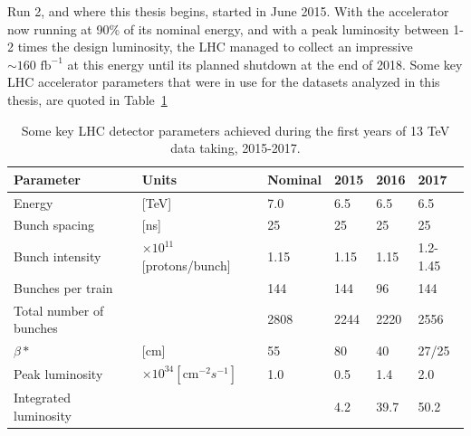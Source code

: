 Run 2, and where this thesis begins, started in June 2015. With the accelerator now running at 90\% of its nominal energy, and with a peak luminosity between 1-2 times the design luminosity, the LHC managed to collect an impressive $\sim 160 \textrm{ fb}^{-1}$ at this energy until its planned shutdown at the end of 2018. Some key LHC accelerator parameters that were in use for the datasets analyzed in this thesis, are quoted in Table~\ref{tab:LHCparameters}

\begin{table}[]
\begin{tabular}{| l | lllll |}
\hline
Parameter               & Units                                   & Nominal & 2015 & 2016 & 2017     \\
\hline
Energy                  & {[}TeV{]}                               & 7.0     & 6.5  & 6.5  & 6.5      \\
Bunch spacing           & {[}ns{]}                                & 25      & 25   & 25   & 25       \\
Bunch intensity         & $\times10^{11}${[}protons/bunch{]}              & 1.15    & 1.15 & 1.15 & 1.2-1.45 \\
Bunches per train       &                                         & 144     & 144  & 96   & 144      \\
Total number of bunches &                                         & 2808    & 2244 & 2220 & 2556     \\
$\beta*$                & {[}cm{]}                                       & 55      & 80   & 40   & 27/25    \\
Peak luminosity         & $\times 10^{34} [\textrm{cm}^{-2} s^{-1}]$ & 1.0     & 0.5  & 1.4  & 2.0      \\
Integrated luminosity   &                                         &         & 4.2  & 39.7 & 50.2    \\
\hline
\end{tabular}
\caption{Some key LHC detector parameters achieved during the first years of 13 TeV data taking, 2015-2017.}
\label{tab:LHCparameters}
\end{table}










